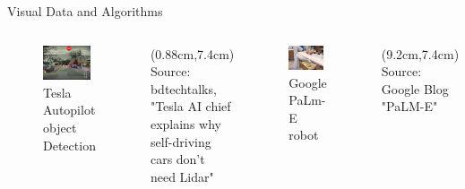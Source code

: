 \documentclass[citestyle=authoryear,bibstyle=numeric,hyperref,backend=biber]{sdqbeamer}
\begin{document}
\begin{frame}{Visual Data and Algorithms}
    \begin{columns}
        \begin{figure}
            \centering
            \includegraphics[width=0.9\textwidth]{pictures/Tesla-object-detection.png}
            \caption{Tesla Autopilot object Detection}
            \label{fig:tesla_object_detection}
        \end{figure}
    
        \begin{textblock*}{6cm}(0.88cm,7.4cm)
             \tiny{Source: bdtechtalks, "Tesla AI chief explains why self-driving cars don’t need Lidar"}
        \end{textblock*}
 
        \begin{figure}
            \centering
            \includegraphics[width=0.9\textwidth]{pictures/palm_e_robot-e1678194832951.jpg}
            \caption{Google PaLm-E robot}
            \label{fig:palm_e_robot}
        \end{figure}

        \begin{textblock*}{6cm}(9.2cm,7.4cm) 
             \tiny{Source: Google Blog "PaLM-E"}
        \end{textblock*}
    \end{columns}
\end{frame}
\end{document}
